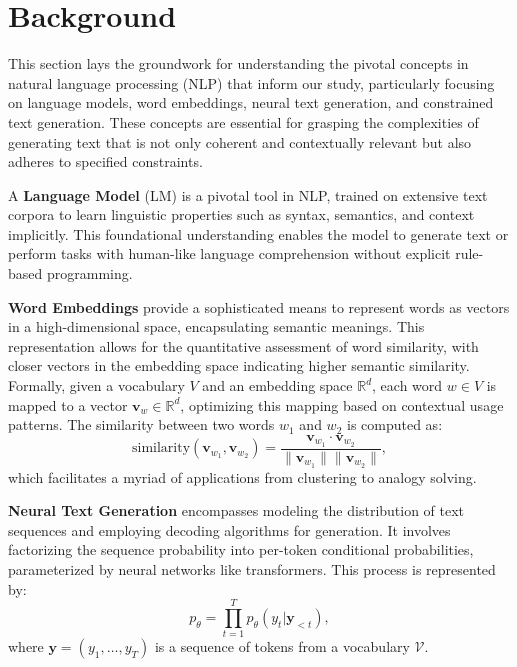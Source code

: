 \documentclass{article}
\begin{document}
\section{Background}

This section lays the groundwork for understanding the pivotal concepts in natural language processing (NLP) that inform our study, particularly focusing on language models, word embeddings, neural text generation, and constrained text generation. These concepts are essential for grasping the complexities of generating text that is not only coherent and contextually relevant but also adheres to specified constraints.

A \textbf{Language Model} (LM) is a pivotal tool in NLP, trained on extensive text corpora to learn linguistic properties such as syntax, semantics, and context implicitly. This foundational understanding enables the model to generate text or perform tasks with human-like language comprehension without explicit rule-based programming.

\textbf{Word Embeddings} provide a sophisticated means to represent words as vectors in a high-dimensional space, encapsulating semantic meanings. This representation allows for the quantitative assessment of word similarity, with closer vectors in the embedding space indicating higher semantic similarity. Formally, given a vocabulary \(V\) and an embedding space \(\mathbb{R}^d\), each word \(w \in V\) is mapped to a vector \(\mathbf{v}_w \in \mathbb{R}^d\), optimizing this mapping based on contextual usage patterns. The similarity between two words \(w_1\) and \(w_2\) is computed as:
\begin{equation}
    \text{similarity}(\mathbf{v}_{w_1}, \mathbf{v}_{w_2}) = \frac{\mathbf{v}_{w_1} \cdot \mathbf{v}_{w_2}}{\|\mathbf{v}_{w_1}\| \|\mathbf{v}_{w_2}\|},
\end{equation}
which facilitates a myriad of applications from clustering to analogy solving.

\textbf{Neural Text Generation} encompasses modeling the distribution of text sequences and employing decoding algorithms for generation. It involves factorizing the sequence probability into per-token conditional probabilities, parameterized by neural networks like transformers. This process is represented by:
\begin{equation}
    p_{\theta} = \prod_{t=1}^{T} p_{\theta} (y_t | \boldsymbol{y}_{<t}),
\end{equation}
where \( \boldsymbol{y} = (y_1, \ldots, y_T) \) is a sequence of tokens from a vocabulary \( \mathcal{V} \).
\end{document}
